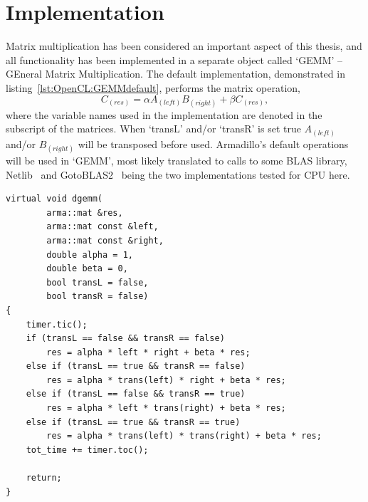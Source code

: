 \section{Implementation}
Matrix multiplication has been considered an important aspect of this thesis, and all functionality has been implemented in a separate object called `GEMM' -- GEneral Matrix Multiplication.
The default implementation, demonstrated in listing~\ref{lst:OpenCL:GEMMdefault}, performs the matrix operation, 
\begin{equation}
C_{(res)} = \alpha A_{(left)} B_{(right)} + \beta C_{(res)} , 
\end{equation}
where the variable names used in the implementation are denoted in the subscript of the matrices.
When `transL' and/or `transR' is set true $A_{(left)}$ and/or $B_{(right)}$ will be transposed before used.
Armadillo's default operations will be used in `GEMM', most likely translated to calls to some BLAS library, Netlib~\cite{netlibblas} and GotoBLAS2~\cite{Goto:2008:HIL:1377603.1377607} being the two implementations tested for CPU here.
\begin{lstlisting}[float,label={lst:OpenCL:GEMMdefault},caption={GEMM default implementation.}]
virtual void dgemm(
        arma::mat &res,
        arma::mat const &left,
        arma::mat const &right,
        double alpha = 1,
        double beta = 0,
        bool transL = false,
        bool transR = false)
{
    timer.tic();
    if (transL == false && transR == false)
        res = alpha * left * right + beta * res;
    else if (transL == true && transR == false)
        res = alpha * trans(left) * right + beta * res;
    else if (transL == false && transR == true)
        res = alpha * left * trans(right) + beta * res;
    else if (transL == true && transR == true)
        res = alpha * trans(left) * trans(right) + beta * res;
    tot_time += timer.toc();

    return;
}
\end{lstlisting}

